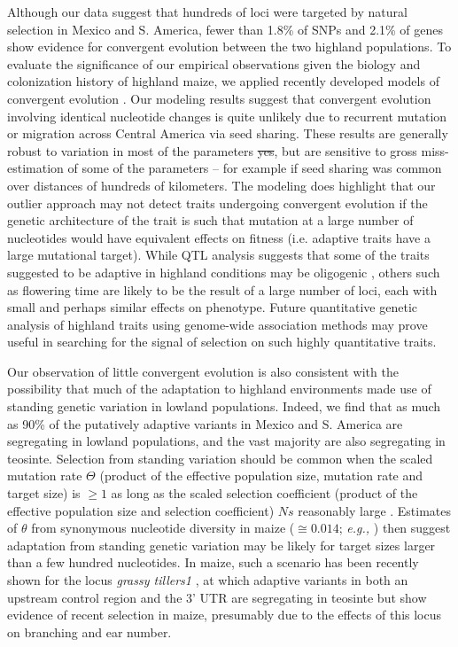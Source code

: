 Although our data suggest that hundreds of loci were targeted by natural selection in Mexico and S. America, fewer than 1.8\% of SNPs and 2.1\% of genes show evidence for convergent evolution between the two highland populations.
To evaluate the significance of our empirical observations given the biology and colonization history of highland maize, we applied recently developed models of convergent evolution \citep{ralph2014convergent}.
Our modeling results suggest that convergent evolution involving identical nucleotide changes is quite unlikely due to recurrent mutation or migration across Central America via seed sharing.   
These results are generally robust to variation in most of the parameters  \st{yes}, but are sensitive to gross miss-estimation of some of the parameters -- for example if seed sharing was common over distances of hundreds of kilometers.  
The modeling does highlight that our outlier approach may not detect traits undergoing convergent evolution if the genetic architecture of the trait is such that mutation at a large number of nucleotides would have equivalent effects on fitness (i.e. adaptive traits have a large mutational target). 
While QTL analysis suggests that some of the traits suggested to be adaptive in highland conditions may be oligogenic \citep{Lauter_2004_15342532}, others such as flowering time \citep{buckler2009genetic} are likely to be the result of a large number of loci, each with small and perhaps similar effects on phenotype.  
Future quantitative genetic analysis of highland traits using genome-wide association methods may prove useful in searching for the signal of selection on such highly quantitative traits. 

Our observation of little convergent evolution is also consistent with the possibility that much of the adaptation to highland environments made use of standing genetic variation in lowland populations. 
Indeed, we find that as much as 90\% of the putatively adaptive variants in Mexico and S. America are segregating in lowland populations, and the vast majority are also segregating in teosinte.  
Selection from standing variation should be common when the scaled mutation rate $\Theta$ (product of the effective population size, mutation rate and target size) is $\geq1$ as long as the scaled selection coefficient (product of the effective population size and selection coefficient) $Ns$ reasonably large \cite[]{Hermisson_2005_15716498}.
Estimates of $\theta$ from synonymous nucleotide diversity in maize ($\cong0.014$; \emph{e.g.,}  \cite{Tenaillon_2004_15014173,Wright_2005_15919994,Ross-Ibarra_2009_19153259}) then suggest adaptation from standing genetic variation may be likely for target sizes larger than a few hundred nucleotides.
In maize, such a scenario has been recently shown for the locus \emph{grassy tillers1} \cite[]{Wills_2013_23825971}, at which adaptive variants in both an upstream control region and the 3' UTR are segregating in teosinte but show evidence of recent selection in maize, presumably due to the effects of this locus on branching and ear number.

